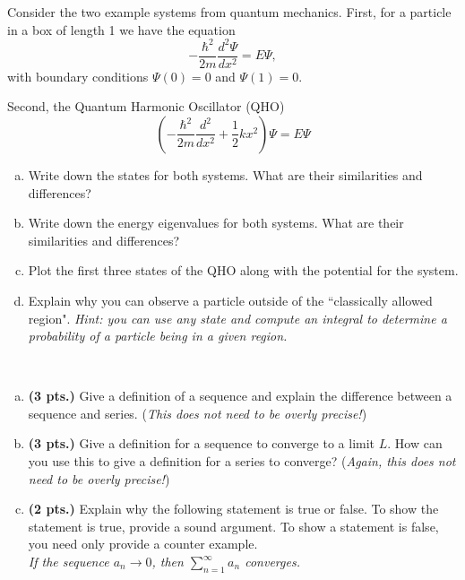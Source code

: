 \begin{problem}
Consider the two example systems from quantum mechanics. First, for a particle in a box of length 1 we have the equation
\[
-\frac{\hbar^2}{2m}\frac{d^2 \Psi}{dx^2} = E\Psi,
\]
with boundary conditions $\Psi(0)=0$ and $\Psi(1)=0$.

Second,  the Quantum Harmonic Oscillator (QHO)
\[
\left(-\frac{\hbar^2}{2m} \frac{d^2}{dx^2} + \frac{1}{2} k x^2\right) \Psi = E\Psi
\]
\begin{enumerate}[(a)]
    \item Write down the states for both systems. What are their similarities and differences?
    \item Write down the energy eigenvalues for both systems. What are their similarities and differences?
    \item Plot the first three states of the QHO along with the potential for the system.
    \item Explain why you can observe a particle outside of the ``classically allowed region". \emph{Hint: you can use any state and compute an integral to determine a probability of a particle being in a given region.}
\end{enumerate}
\end{problem}

\begin{problem} ~
\begin{enumerate}[(a)]
\item \textbf{(3 pts.)} Give a definition of a sequence and explain the difference between a sequence and series. (\emph{This does not need to be overly precise!})

\item \textbf{(3 pts.)} Give a definition for a sequence to converge to a limit $L$. How can you use this to give a definition for a series to converge? (\emph{Again, this does not need to be overly precise!})

    \item \textbf{(2 pts.)} Explain why the following statement is true or false. To show the statement is true, provide a sound argument. To show a statement is false, you need only provide a counter example.\\

\emph{If the sequence $a_n \to 0$, then $\displaystyle{\sum_{n=1}^\infty a_n}$ converges.}

\end{enumerate}
\end{problem}

